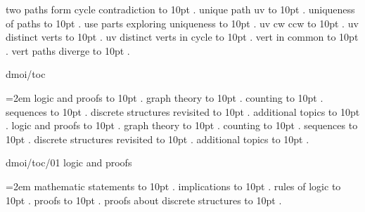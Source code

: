 \smallskip
two paths form cycle contradiction \leaders\hbox to 10pt {\hss.\hss}  \hfill {}
\smallskip
unique path uv \leaders\hbox to 10pt {\hss.\hss}  \hfill {}
\smallskip
uniqueness of paths \leaders\hbox to 10pt {\hss.\hss}  \hfill {}
\smallskip
use parts exploring uniqueness \leaders\hbox to 10pt {\hss.\hss}  \hfill {}
\smallskip
uv cw ccw \leaders\hbox to 10pt {\hss.\hss}  \hfill {}
\smallskip
uv distinct verts \leaders\hbox to 10pt {\hss.\hss}  \hfill {}
\smallskip
uv distinct verts in cycle \leaders\hbox to 10pt {\hss.\hss}  \hfill {}
\smallskip
vert in common \leaders\hbox to 10pt {\hss.\hss}  \hfill {}
\smallskip
vert paths diverge \leaders\hbox to 10pt {\hss.\hss}  \hfill {}
\smallskip
\par\endgroup
\bigskip
{}
dmoi/toc
\par\begingroup
\leftskip=2em
 logic and proofs \leaders\hbox to 10pt {\hss.\hss}  \hfill {}
 graph theory \leaders\hbox to 10pt {\hss.\hss}  \hfill {}
 counting \leaders\hbox to 10pt {\hss.\hss}  \hfill {}
 sequences \leaders\hbox to 10pt {\hss.\hss}  \hfill {}
 discrete structures revisited \leaders\hbox to 10pt {\hss.\hss}  \hfill {}
 additional topics \leaders\hbox to 10pt {\hss.\hss}  \hfill {}
\smallskip
{} logic and proofs \leaders\hbox to 10pt {\hss.\hss}  \hfill {}
 graph theory \leaders\hbox to 10pt {\hss.\hss}  \hfill {}
 counting \leaders\hbox to 10pt {\hss.\hss}  \hfill {}
 sequences \leaders\hbox to 10pt {\hss.\hss}  \hfill {}
 discrete structures revisited \leaders\hbox to 10pt {\hss.\hss}  \hfill {}
 additional topics \leaders\hbox to 10pt {\hss.\hss}  \hfill {}
\smallskip
\par\endgroup
\bigskip
{}
dmoi/toc/01 logic and proofs
\par\begingroup
\leftskip=2em
\smallskip
{} mathematic statements \leaders\hbox to 10pt {\hss.\hss}  \hfill {}
 implications \leaders\hbox to 10pt {\hss.\hss}  \hfill {}
 rules of logic \leaders\hbox to 10pt {\hss.\hss}  \hfill {}
 proofs \leaders\hbox to 10pt {\hss.\hss}  \hfill {}
 proofs about discrete structures \leaders\hbox to 10pt {\hss.\hss}  \hfill {}
\smallskip
\par\endgroup
